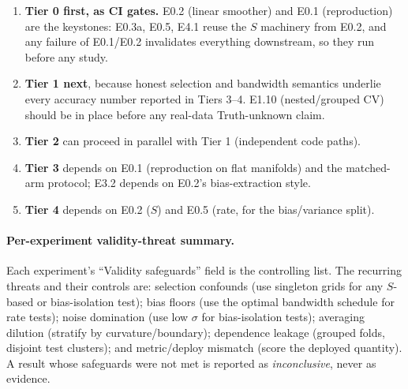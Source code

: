 \documentclass[11pt]{article}
\begin{document}
\begin{enumerate}[leftmargin=1.5em]
\item \textbf{Tier 0 first, as CI gates.} E0.2 (linear smoother) and E0.1 (reproduction) are the
keystones: E0.3a, E0.5, E4.1 reuse the $S$ machinery from E0.2, and any failure of E0.1/E0.2
invalidates everything downstream, so they run before any study.
\item \textbf{Tier 1 next}, because honest selection and bandwidth semantics underlie every
accuracy number reported in Tiers 3--4. E1.10 (nested/grouped CV) should be in place before any
real-data Truth-unknown claim.
\item \textbf{Tier 2} can proceed in parallel with Tier 1 (independent code paths).
\item \textbf{Tier 3} depends on E0.1 (reproduction on flat manifolds) and the matched-arm
protocol; E3.2 depends on E0.2's bias-extraction style.
\item \textbf{Tier 4} depends on E0.2 ($S$) and E0.5 (rate, for the bias/variance split).
\end{enumerate}

\paragraph{Per-experiment validity-threat summary.} Each experiment's ``Validity safeguards''
field is the controlling list. The recurring threats and their controls are: selection confounds
(use singleton grids for any $S$-based or bias-isolation test); bias floors (use the optimal
bandwidth schedule for rate tests); noise domination (use low $\sigma$ for bias-isolation tests);
averaging dilution (stratify by curvature/boundary); dependence leakage (grouped folds, disjoint
test clusters); and metric/deploy mismatch (score the deployed quantity). A result whose safeguards
were not met is reported as \emph{inconclusive}, never as evidence.
\end{document}
